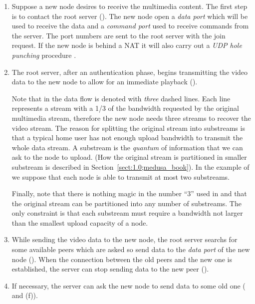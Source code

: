 \documentclass{medusabook}
\begin{document}
\begin{enumerate}
\item
Suppose a new node desires to receive the multimedia content.  The
first step is to contact the root server ().  The new
node open a \emph{data port} which will be used to receive the data
and a \emph{command port} used to receive commands from the server.
The port numbers are sent to the root server with the join request.
If the new node is behind a NAT it will also carry out a \emph{UDP
hole punching} procedure \cite{UDP_hole}.
\item
The root server, after an authentication phase, begins transmitting
the video data to the new node to allow for an immediate playback
().  

Note that in  the data flow is denoted with
\emph{three} dashed lines.  Each line represents a stream with a 1/3
of the bandwidth requested by the original multimedia stream,
therefore the new node needs three streams to recover the video
stream. The reason for splitting the original stream into substreams
is that a typical home user has not enough upload bandwidth to
transmit the whole data stream.  A substream is the \emph{quantum} of
information that we can ask to the node to upload.  (How the original
stream is partitioned in smaller substream is described in
Section~\ref{sect:1.0;medusa_book}). In the example of  we
suppose that each node is able to transmit at most two substreams.

Finally, note that there is nothing magic in the number ``3'' used in
 and that the original stream can be partitioned into any
number of substreams.  The only constraint is that each substream must
require a bandwidth not larger than the smallest upload capacity of a
node. 
\item
While sending the video data to the new node, the root server searchs
for some available peers which are asked so send data to the
\emph{data port} of the new node ().  When the connection
between the old peers and the new one is established, the server can
stop sending data to the new peer ().
\item
If necessary, the server can ask the new node to send data to some old
one ( and (f)).
\end{enumerate}
%
\end{document}
